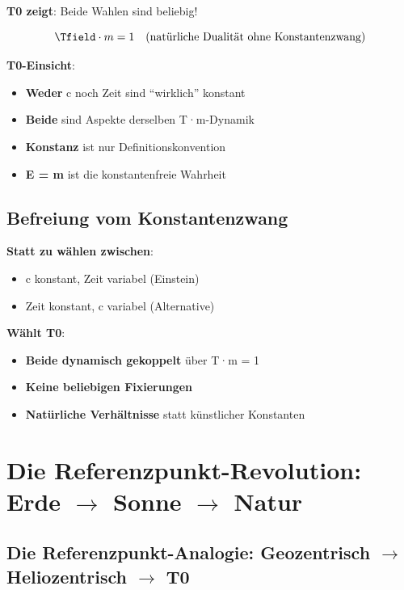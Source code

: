 	\textbf{T0 zeigt}: Beide Wahlen sind beliebig!
	
	\begin{equation}
		\Tfield \cdot m = 1 \quad \text{(natürliche Dualität ohne Konstantenzwang)}
	\end{equation}
	
	\textbf{T0-Einsicht}:
	\begin{itemize}
		\item \textbf{Weder} c noch Zeit sind ``wirklich'' konstant
		\item \textbf{Beide} sind Aspekte derselben T·m-Dynamik
		\item \textbf{Konstanz} ist nur Definitionskonvention
		\item \textbf{E = m} ist die konstantenfreie Wahrheit
	\end{itemize}
	
	\subsection{Befreiung vom Konstantenzwang}
	
	\textbf{Statt zu wählen zwischen}:
	\begin{itemize}
		\item c konstant, Zeit variabel (Einstein)
		\item Zeit konstant, c variabel (Alternative)
	\end{itemize}
	
	\textbf{Wählt T0}:
	\begin{itemize}
		\item \textbf{Beide dynamisch gekoppelt} über T·m = 1
		\item \textbf{Keine beliebigen Fixierungen}
		\item \textbf{Natürliche Verhältnisse} statt künstlicher Konstanten
	\end{itemize}
	
	\section{Die Referenzpunkt-Revolution: Erde $\rightarrow$ Sonne $\rightarrow$ Natur}
	
	\subsection{Die Referenzpunkt-Analogie: Geozentrisch $\rightarrow$ Heliozentrisch $\rightarrow$ T0}
	
